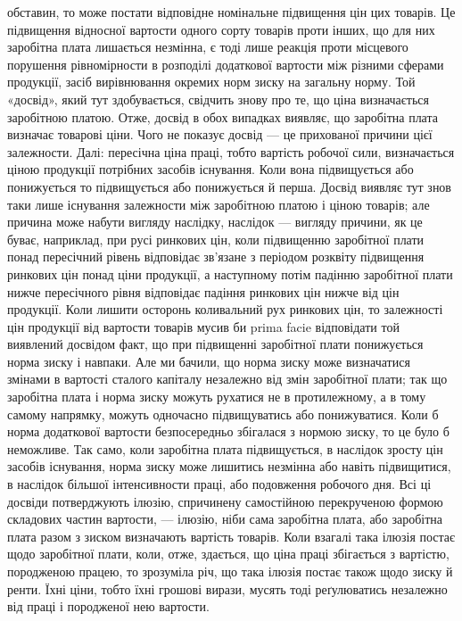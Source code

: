 \parcont{}  %
обставин, то може постати відповідне номінальне підвищення цін цих товарів. Це
підвищення відносної вартости одного сорту товарів проти інших, що для них
заробітна плата лишається незмінна, є тоді лише реакція проти місцевого порушення
рівномірности в розподілі додаткової вартости між різними сферами продукції,
засіб вирівнювання окремих норм зиску на загальну норму. Той «досвід», який
тут здобувається, свідчить знову про те, що ціна визначається заробітною платою.
Отже, досвід в обох випадках виявляє, що заробітна плата визначає товарові
ціни. Чого не показує досвід — це прихованої причини цієї залежности.
Далі: пересічна ціна праці, тобто вартість робочої сили, визначається ціною
продукції потрібних засобів існування. Коли вона підвищується або понижується
то підвищується або понижується й перша. Досвід виявляє тут знов таки лише
існування залежности між заробітною платою і ціною товарів; але причина
може набути вигляду наслідку, наслідок — вигляду причини, як це буває, наприклад,
при русі ринкових цін, коли підвищенню заробітної плати понад пересічний
рівень відповідає зв’язане з періодом розквіту підвищення ринкових цін
понад ціни продукції, а наступному потім падінню заробітної плати нижче пересічного
рівня відповідає падіння ринкових цін нижче від цін продукції. Коли
лишити осторонь коливальний рух ринкових цін, то залежності цін продукції
від вартости товарів мусив би prima facie відповідати той виявлений досвідом
факт, що при підвищенні заробітної плати понижується норма зиску і навпаки.
Але ми бачили, що норма зиску може визначатися змінами в вартості сталого
капіталу незалежно від змін заробітної плати; так що заробітна плата і
норма зиску можуть рухатися не в протилежному, а в тому самому напрямку,
можуть одночасно підвищуватись або понижуватися. Коли б норма додаткової
вартости безпосередньо збігалася з нормою зиску, то це було б неможливе.
Так само, коли заробітна плата підвищується, в наслідок зросту цін засобів
існування, норма зиску може лишитись незмінна або навіть підвищитися, в наслідок
більшої інтенсивности праці, або подовження робочого дня. Всі ці досвіди
потверджують ілюзію, спричинену самостійною перекрученою формою складових
частин вартости, — ілюзію, ніби сама заробітна плата, або заробітна плата разом
з зиском визначають вартість товарів. Коли взагалі така ілюзія постає
щодо заробітної плати, коли, отже, здається, що ціна праці збігається з вартістю,
породженою працею, то зрозуміла річ, що така ілюзія постає також щодо зиску
й ренти. Їхні ціни, тобто їхні грошові вирази, мусять тоді реґулюватись
незалежно від праці і породженої нею вартости.

